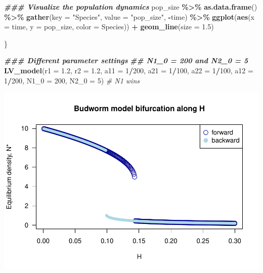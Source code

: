 \documentclass[
]{book}
\newenvironment{Shaded}{\begin{snugshade}}{\end{snugshade}}
\newcommand{\AttributeTok}[1]{\textcolor[rgb]{0.13,0.29,0.53}{#1}}
\newcommand{\CommentTok}[1]{\textcolor[rgb]{0.56,0.35,0.01}{\textit{#1}}}
\newcommand{\DecValTok}[1]{\textcolor[rgb]{0.00,0.00,0.81}{#1}}
\newcommand{\DocumentationTok}[1]{\textcolor[rgb]{0.56,0.35,0.01}{\textbf{\textit{#1}}}}
\newcommand{\FloatTok}[1]{\textcolor[rgb]{0.00,0.00,0.81}{#1}}
\newcommand{\FunctionTok}[1]{\textcolor[rgb]{0.13,0.29,0.53}{\textbf{#1}}}
\newcommand{\NormalTok}[1]{#1}
\newcommand{\SpecialCharTok}[1]{\textcolor[rgb]{0.81,0.36,0.00}{\textbf{#1}}}
\newcommand{\StringTok}[1]{\textcolor[rgb]{0.31,0.60,0.02}{#1}}
\begin{document}
\begin{Shaded}
\begin{Highlighting}[]
  \DocumentationTok{\#\#\# Visualize the population dynamics}
\NormalTok{  pop\_size }\SpecialCharTok{\%\textgreater{}\%}
    \FunctionTok{as.data.frame}\NormalTok{() }\SpecialCharTok{\%\textgreater{}\%}
    \FunctionTok{gather}\NormalTok{(}\AttributeTok{key =} \StringTok{"Species"}\NormalTok{, }\AttributeTok{value =} \StringTok{"pop\_size"}\NormalTok{, }\SpecialCharTok{{-}}\NormalTok{time) }\SpecialCharTok{\%\textgreater{}\%}
    \FunctionTok{ggplot}\NormalTok{(}\FunctionTok{aes}\NormalTok{(}\AttributeTok{x =}\NormalTok{ time, }\AttributeTok{y =}\NormalTok{ pop\_size, }\AttributeTok{color =}\NormalTok{ Species)) }\SpecialCharTok{+}
    \FunctionTok{geom\_line}\NormalTok{(}\AttributeTok{size =} \FloatTok{1.5}\NormalTok{)}

\NormalTok{\}}

  \DocumentationTok{\#\#\# Different parameter settings}
  \DocumentationTok{\#\# N1\_0 = 200 and N2\_0 = 5}
  \FunctionTok{LV\_model}\NormalTok{(}\AttributeTok{r1 =} \FloatTok{1.2}\NormalTok{, }\AttributeTok{r2 =} \FloatTok{1.2}\NormalTok{, }\AttributeTok{a11 =} \DecValTok{1}\SpecialCharTok{/}\DecValTok{200}\NormalTok{, }\AttributeTok{a21 =} \DecValTok{1}\SpecialCharTok{/}\DecValTok{100}\NormalTok{, }\AttributeTok{a22 =} \DecValTok{1}\SpecialCharTok{/}\DecValTok{100}\NormalTok{, }\AttributeTok{a12 =} \DecValTok{1}\SpecialCharTok{/}\DecValTok{200}\NormalTok{, }\AttributeTok{N1\_0 =} \DecValTok{200}\NormalTok{, }\AttributeTok{N2\_0 =} \DecValTok{5}\NormalTok{)  }\CommentTok{\# N1 wins}
\end{Highlighting}
\end{Shaded}

\includegraphics{bookdown-demo_files/figure-latex/unnamed-chunk-21-1.pdf}
\end{document}
